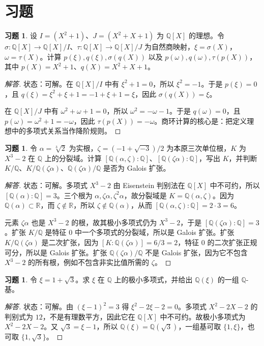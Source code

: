 \documentclass[11pt,a4paper,openany]{ctexbook}
\numberwithin{equation}{chapter}
\newcommand{\Q}{\mathbb{Q}}
\newcommand{\R}{\mathbb{R}}
\theoremstyle{plain}
\theoremstyle{definition}
\newtheorem{exercise}[theorem]{习题}
\theoremstyle{remark}
\begin{document}
\section*{习题}

\begin{exercise}
设 $I=(X^2+1)$、$J=(X^2+X+1)$ 为 $\Q[X]$ 的理想。令 $\sigma:\Q[X]\to\Q[X]/I$、$\tau:\Q[X]\to\Q[X]/J$ 为自然商映射，$\xi=\sigma(X)$，$\omega=\tau(X)$。计算 $p(\xi),q(\xi),\sigma(q(X))$ 以及 $p(\omega),q(\omega),\tau(p(X))$，其中 $p(X)=X^2+1$、$q(X)=X^2+X+1$。
\end{exercise}
\begin{proof}[解答]
状态：可解。在 $\Q[X]/I$ 中有 $\xi^2+1=0$，所以 $\xi^2=-1$。于是 $p(\xi)=0$，且 $q(\xi)=\xi^2+\xi+1=-1+\xi+1=\xi$，因此 $\sigma(q(X))=\xi$。

在 $\Q[X]/J$ 中有 $\omega^2+\omega+1=0$，所以 $\omega^2=-\omega-1$。于是 $q(\omega)=0$，且 $p(\omega)=\omega^2+1=-\omega$，因此 $\tau(p(X))=-\omega$。商环计算的核心是：把定义理想中的多项式关系当作降阶规则。
\end{proof}

\begin{exercise}
令 $\alpha=\sqrt[3]{2}$ 为实根，$\zeta=(-1+\sqrt{-3})/2$ 为本原三次单位根，$K$ 为 $X^3-2$ 在 $\Q$ 上的分裂域。计算 $[\Q(\alpha,\zeta):\Q]$、$[\Q(\zeta\alpha):\Q]$，写出 $K$，并判断 $K/\Q$、$K/\Q(\zeta\alpha)$、$\Q(\zeta\alpha)/\Q$ 是否为 Galois 扩张。
\end{exercise}
\begin{proof}[解答]
状态：可解。多项式 $X^3-2$ 由 Eisenstein 判别法在 $\Q[X]$ 中不可约，所以 $[\Q(\alpha):\Q]=3$。三个根为 $\alpha,\zeta\alpha,\zeta^2\alpha$，故分裂域是 $K=\Q(\alpha,\zeta)$。因为 $\Q(\alpha)\subset\R$，而 $\zeta\notin\R$，所以 $\zeta\notin\Q(\alpha)$，从而 $[\Q(\alpha,\zeta):\Q]=2\cdot3=6$。

元素 $\zeta\alpha$ 也是 $X^3-2$ 的根，故其极小多项式仍为 $X^3-2$，于是 $[\Q(\zeta\alpha):\Q]=3$。扩张 $K/\Q$ 是特征 $0$ 中一个多项式的分裂域，所以是 Galois 扩张。扩张 $K/\Q(\zeta\alpha)$ 是二次扩张，因为 $[K:\Q(\zeta\alpha)]=6/3=2$，特征 $0$ 的二次扩张正规可分，所以是 Galois 扩张。扩张 $\Q(\zeta\alpha)/\Q$ 不是 Galois 扩张，因为它不包含 $X^3-2$ 的所有根，例如不包含非实比值所需的 $\zeta$。
\end{proof}

\begin{exercise}
令 $\xi=1+\sqrt3$。求 $\xi$ 在 $\Q$ 上的极小多项式，并给出 $\Q(\xi)$ 的一组 $\Q$-基。
\end{exercise}
\begin{proof}[解答]
状态：可解。由 $(\xi-1)^2=3$ 得 $\xi^2-2\xi-2=0$。多项式 $X^2-2X-2$ 的判别式为 $12$，不是有理数平方，因此它在 $\Q[X]$ 中不可约。故极小多项式为 $X^2-2X-2$。又 $\sqrt3=\xi-1$，所以 $\Q(\xi)=\Q(\sqrt3)$，一组基可取 $\{1,\xi\}$，也可取 $\{1,\sqrt3\}$。
\end{proof}
\end{document}
